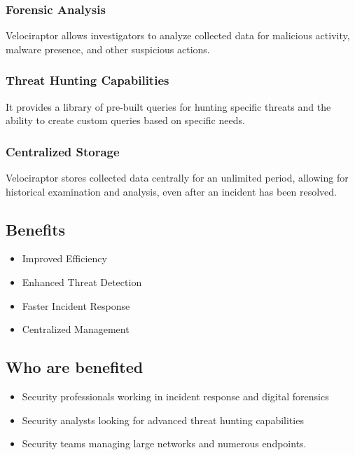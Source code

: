 \documentclass[a4paper, 11pt, oneside]{article} %
\begin{document}
\subsubsection{Forensic Analysis} 
Velociraptor allows investigators to analyze collected data for malicious activity, malware presence, and other suspicious actions.

\subsubsection{Threat Hunting Capabilities} 
It provides a library of pre-built queries for hunting specific threats and the ability to create custom queries based on specific needs.

\subsubsection{Centralized Storage}
Velociraptor stores collected data centrally for an unlimited period, allowing for historical examination and analysis, even after an incident has been resolved.

\subsection{Benefits}
\begin{itemize}
    \item Improved Efficiency
    \item Enhanced Threat Detection
    \item Faster Incident Response
    \item Centralized Management
\end{itemize}

\subsection{Who are benefited}
\begin{itemize}
    \item Security professionals working in incident response and digital forensics
    \item Security analysts looking for advanced threat hunting capabilities
    \item Security teams managing large networks and numerous endpoints.
\end{itemize}
\end{document}
